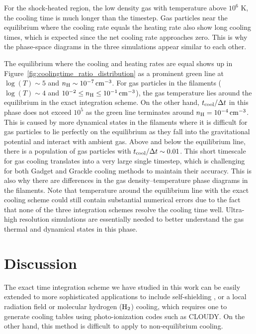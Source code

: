 \documentclass[a4paper,fleqn,usenatbib,useAMS, twocolumn]{mnras}
\begin{document}
For the shock-heated region, the low density gas with temperature above $10^6$ K, 
the cooling time is much longer than the timestep. Gas particles near the equilibrium where 
the cooling rate equals the heating rate also show long cooling times, which is expected since 
the net cooling rate approaches zero. This is why the phase-space diagrams in the three 
simulations appear similar to each other. 

The equilibrium where the cooling and heating rates are equal shows up in 
Figure~\ref{fig:coolingtime_ratio_distribution} as a prominent green line
at $\log(T)\sim 5$  and $n_{\rm H}\sim10^{-7}\, \rm{cm^{-3}}$. For gas particles in the filaments
($\log(T)\sim 4$ and $10^{-2} \le n_{\rm H} \le 10^{-1}\, \rm{cm^{-3}}$), the gas temperature lies 
around the equilibrium in the exact integration scheme. 
On the other hand, $t_{\rm cool}/\Delta t$ in this phase does not exceed 
$10^5$ as the green line terminates around $n_{\rm H} = 10^{-4}\, \rm{cm^{-3}}$.
This is caused by more dynamical 
states in the filaments where it is difficult for gas particles to lie perfectly on the equilibrium 
as they fall into the gravitational potential and interact with ambient gas. 
Above and below the equilibrium line, there is a population of gas particles with 
$t_{\rm cool}/\Delta t \sim 0.01$. This short timescale for gas cooling translates into 
a very large single timestep, which is challenging for both {\sc Gadget} and {\sc Grackle}
cooling methods to maintain their accuracy. This is also why there are differences in 
the gas density--temperature phase diagrams in the filaments. 
Note that temperature around the equilibrium line with the exact
cooling scheme could still contain substantial numerical errors due to the fact
that none of the three integration schemes resolve the cooling time well. Ultra-high
resolution simulations \cite[e.g.,][]{Nelson2016} are essentially needed to better 
understand the gas thermal and dynamical states in this phase.



\section{Discussion}
\label{sec:discussion} 

The exact time integration scheme we have studied in this work can be easily extended to more
sophisticated applications to include self-shielding \citep{Rahmati2013}, or
a local radiation field \citep{Vogelsberger2013, Gnedin2012} or molecular hydrogen 
($\rm{H_2}$) cooling, which requires one to generate cooling tables using photo-ionization 
codes such as {\sc CLOUDY}. On the other hand, this method is difficult to apply to 
non-equilibrium cooling. 
\end{document}
